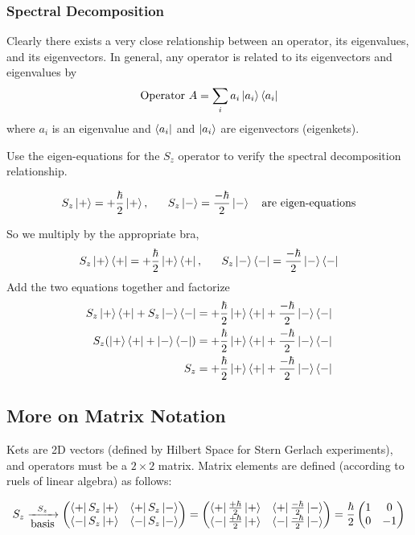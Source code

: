 \documentclass[english, 11pt]{article}
\begin{document}
      \subsubsection{Spectral Decomposition}

        Clearly there exists a very close relationship between an operator, its eigenvalues, and its eigenvectors. In general, any operator is related to its eigenvectors and eigenvalues by
        \[ \mbox{Operator } A = \sum_i a_i \left|a_i\right\rangle\left\langle a_i\right| \]
        where $a_i$ is an eigenvalue and $\left\langle a_i\right|$ and $\left|a_i\right\rangle$ are eigenvectors (eigenkets).

        \begin{exmp}
          Use the eigen-equations for the $S_z$ operator to verify the spectral decomposition relationship.

          \[ S_z\ket{+} = +\f{\hbar}{2}\kp, \ \ \ \ \ S_z\km = \f{-\hbar}{2}\km \ \ \ \mbox{are eigen-equations} \]

          So we multiply by the appropriate bra,
          \[ S_z\ket{+}\bra{+} = +\f{\hbar}{2}\kp\bra{+}, \ \ \ \ \ S_z\km\bra{-} = \f{-\hbar}{2}\km\bra{-} \]
          Add the two equations together and factorize
          \begin{align*}
            S_z\left|+\right\rangle\left\langle+\right| + S_z\left|-\right\rangle\left\langle-\right| & = +\frac{\hbar}{2}\left|+\right\rangle\left\langle+\right| + \frac{-\hbar}{2}\left|-\right\rangle\left\langle-\right| \\
            S_z(\left|+\right\rangle\left\langle+\right| + \left|-\right\rangle\left\langle-\right|) & = +\frac{\hbar}{2}\left|+\right\rangle\left\langle+\right| + \frac{-\hbar}{2}\left|-\right\rangle\left\langle-\right| \\
            S_z & = +\frac{\hbar}{2}\left|+\right\rangle\left\langle+\right| + \frac{-\hbar}{2}\left|-\right\rangle\left\langle-\right|
          \end{align*}
        \end{exmp}

    \subsection{More on Matrix Notation}

      Kets are 2D vectors (defined by Hilbert Space for Stern Gerlach experiments), and operators must be a $2\times 2$ matrix. Matrix elements are defined (according to ruels of linear algebra) as follows:

      \[ S_z \xrightarrow[\mbox{basis}]{S_z}  \left(\begin{matrix}\left\langle+\right|S_z\left|+\right\rangle & \left\langle+\right|S_z\left|-\right\rangle \\ \left\langle-\right|S_z\left|+\right\rangle & \left\langle-\right|S_z\left|-\right\rangle\end{matrix}\right) = \left(\begin{matrix}\left\langle+\right|\frac{+\hbar}{2}\left|+\right\rangle & \left\langle+\right|\frac{-\hbar}{2}\left|-\right\rangle \\ \left\langle-\right|\frac{+\hbar}{2}\left|+\right\rangle & \left\langle-\right|\frac{-\hbar}{2}\left|-\right\rangle\end{matrix}\right) = \frac{\hbar}{2} \left(\begin{matrix}1 & 0 \\ 0 & - 1\end{matrix}\right) \]
\end{document}
